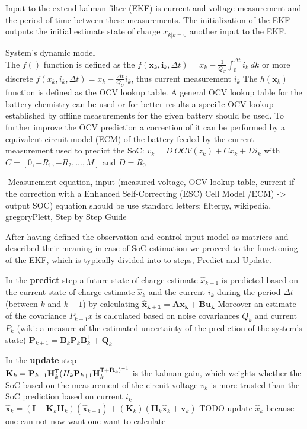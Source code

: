 Input to the extend kalman filter (EKF) is current and voltage measurement and the period of time between these measurements. The initialization of the EKF outputs the initial estimate state of charge  ${x}_{k|k=0} $ another input to the EKF. 

{System's dynamic model} \\
The $f() $ function is defined as the $ f({\boldsymbol {x}}_{k},{\boldsymbol {i}}_{k},\Delta{t}) = {x}_{k} - \frac{1}{{Q_{C}}}\int_{0}^{\Delta t} {i_{k}\ dk} $ or more discrete $f({x}_{k},{i}_{k},\Delta{t}) = {x}_{k} - \frac{\Delta t}{Q_{C}} i_{k} $, thus current measurement $ {i}_{k} $ 
The $h({\boldsymbol {x}}_{{k}})$ function is defined as the OCV lookup table. A general OCV lookup table for the battery chemistry can be used or for better results a specific OCV lookup established by offline measurements for  the given battery should be used. 
To further improve the OCV prediction a correction of it can be performed by a equivalent circuit model (ECM) of the battery feeded by the current measurement used to predict the SoC: 
$ {v}_{k} = {D} \ {OCV}({z}_{k}) + C {x}_{k}  +  D {i}_{k}  $ 
with $ C = [0, -R_1, -R_2, ..., M] $ and $ D = R_0 $

-Measurement equation, input (measured voltage, OCV lookup table, current if the correction with a Enhanced Self-Correcting (ESC) Cell Model /ECM) -> output SOC)
equation should be use standard letters: filterpy, wikipedia, gregoryPlett, Step by Step Guide

After having defined the observation and control-input model as matrices and described their meaning in case of SoC estimation we proceed to the functioning of the EKF, which is typically divided into to steps, Predict and Update. 

In the \textbf{predict} step a future state of charge estimate  $\hat x_{k+1}$ is predicted based on the current state of charge estimate $\hat x_k$ and the current $i_k$ during the period $\Delta t$ (between $k$ and $k+1$) by calculating $ \mathbf{\hat x_{k+1}=Ax_{k}+Bu_{k}} $ Moreover an estimate of the covariance $P_{k+1}x$ is calculated based on noise covariances $Q_k$ and current $P_k$ (wiki: a measure of the estimated uncertainty of the prediction of the system's state)  $\mathbf {P} _{k+1}=\mathbf {B} _{k}\mathbf {P} _{k}\mathbf {B} _{k}^{\textsf {T}}+\mathbf {Q} _{k} $

In the \textbf{update} step  \\
$ \mathbf {K} _{k}=\mathbf {P} _{k+1}\mathbf {H} _{k}^ \textsf {T} (  \mathbf \mathbf {H} _{k}\mathbf {P} _{k+1}\mathbf {H} _{k}^{\textsf {T}+\mathbf {R} _{k})^{-1}}$  is the kalman gain, which weights whether the SoC based on the measurement of the circuit voltage $v_k$ is more trusted than the SoC prediction based on current $i_k$ \\
$ {\hat {\mathbf {x} }}_{k}=(\mathbf {I} -\mathbf {K} _{k}\mathbf {H} _{k})({\hat {\mathbf {x} }}_{k+1})+(\mathbf {K} _{k})(\mathbf {H} _{k}\mathbf {\hat x} _{k}+\mathbf {v} _{k}) $ TODO update $\hat x_k$ because one can not now want one want to calculate\\  

